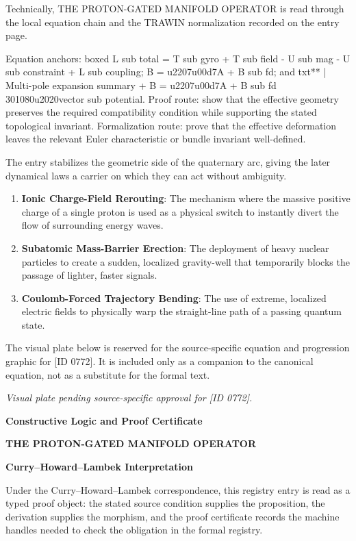 Technically, THE PROTON-GATED MANIFOLD OPERATOR is read through the local equation chain and the TRAWIN normalization recorded on the entry page.

Equation anchors: boxed L sub total = T sub gyro + T sub field - U sub mag - U sub constraint + L sub coupling; B = u2207u00d7A + B sub fd; and txt** | Multi-pole expansion summary + B = u2207u00d7A + B sub fd 301080u2020vector sub potential. Proof route: show that the effective geometry preserves the required compatibility condition while supporting the stated topological invariant. Formalization route: prove that the effective deformation leaves the relevant Euler characteristic or bundle invariant well-defined.

The entry stabilizes the geometric side of the quaternary arc, giving the later dynamical laws a carrier on which they can act without ambiguity.
\endgroup

\begin{enumerate}[leftmargin=1.6em,itemsep=6pt,topsep=4pt]
\item \textbf{Ionic Charge-Field Rerouting}: The mechanism where the massive positive charge of a single proton is used as a physical switch to instantly divert the flow of surrounding energy waves.
\item \textbf{Subatomic Mass-Barrier Erection}: The deployment of heavy nuclear particles to create a sudden, localized gravity-well that temporarily blocks the passage of lighter, faster signals.
\item \textbf{Coulomb-Forced Trajectory Bending}: The use of extreme, localized electric fields to physically warp the straight-line path of a passing quantum state.
\end{enumerate}

\begingroup\footnotesize\sloppy
The visual plate below is reserved for the source-specific equation and progression graphic for [ID 0772]. It is included only as a companion to the canonical equation, not as a substitute for the formal text.
\par\endgroup
\begingroup\footnotesize\itshape
Visual plate pending source-specific approval for [ID 0772].
\par\endgroup

\clearpage
\begingroup\tzpsupportsetup
\noindent\textbf{\fontsize{10.8pt}{12.8pt}\selectfont [ID 0772] Constructive Logic and Proof Certificate}\par
\noindent\textbf{\fontsize{10pt}{12pt}\selectfont THE PROTON-GATED MANIFOLD OPERATOR}\par
\vspace{0.45em}
\begingroup
\footnotesize
\setlength{\parskip}{0.22em}
\setlength{\parindent}{0pt}
\noindent\textbf{Curry--Howard--Lambek Interpretation}\par
Under the Curry--Howard--Lambek correspondence, this registry entry is read as a typed proof
object: the stated source condition supplies the proposition, the derivation supplies the
morphism, and the proof certificate records the machine handles needed to check the obligation
in the formal registry.

